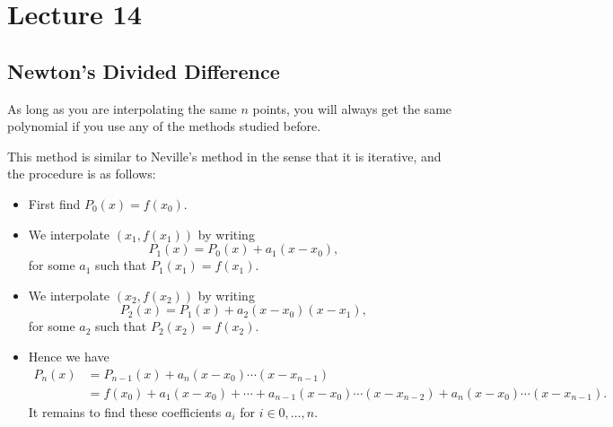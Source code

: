 \documentclass[class=article, crop=false]{standalone}
\begin{document}
  \section{Lecture 14}
  \subsection{Newton's Divided Difference}
  As long as you are interpolating the same $n$ points, you will always get the same polynomial if you use any of the methods studied before. \par
  This method is similar to Neville's method in the sense that it is iterative, and the procedure is as follows:
  \begin{itemize}
    \item First find $P_0(x) = f(x_0)$.
    \item We interpolate $(x_1, f(x_1))$ by writing
    \[
      P_1(x) = P_0(x) + a_1(x - x_0),
    \]
    for some $a_1$ such that $P_1(x_1) = f(x_1)$.
    \item We interpolate $(x_2, f(x_2))$ by writing
    \[
      P_2(x) = P_1(x) + a_2(x - x_0)(x - x_1),
    \]
    for some $a_2$ such that $P_2(x_2) = f(x_2)$.
    \item Hence we have
    \begin{align*}
      P_n(x) &= P_{n - 1}(x) + a_n(x - x_0)\dotsb(x - x_{n - 1}) \\
             &= f(x_0) + a_1(x - x_0) + \dotsb + a_{n - 1}(x - x_0)\dotsb(x - x_{n - 2}) + a_n(x - x_0)\dotsb(x - x_{n - 1}).
    \end{align*}
    It remains to find these coefficients $a_i$ for $i\in 0,\dotsc,n$.
  \end{itemize}
\end{document}
